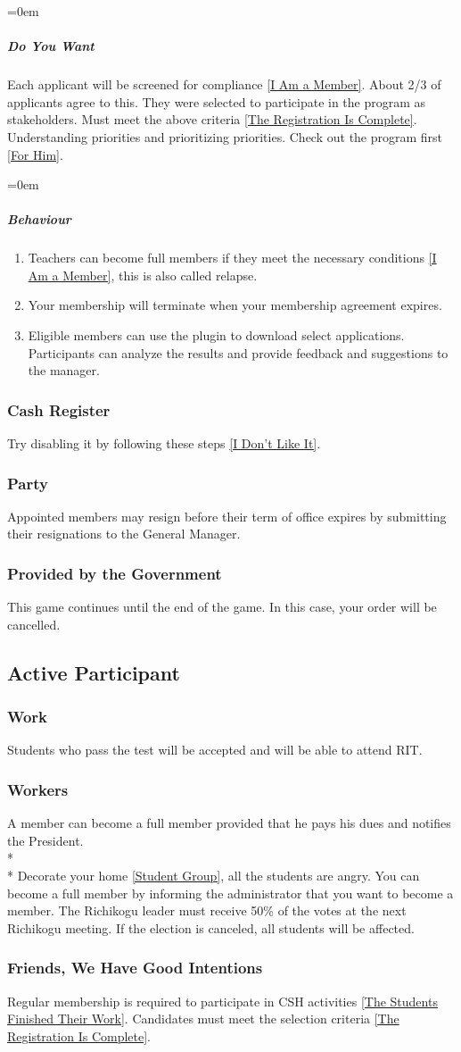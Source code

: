 \documentclass{article}
\newcommand{\asection}[1]{\subsection{#1} \label{#1}}
\newcommand{\asubsection}[1]{\subsubsection{#1} \label{#1}}
\newcommand{\asubsubsubsection}[1]{\parindent=0em\subparagraph{#1} \label{#1}}
\begin{document}
\asubsubsubsection{Do You Want}
Each applicant will be screened for compliance \ref{I Am a Member}.
About 2/3 of applicants agree to this.
They were selected to participate in the program as stakeholders. Must meet the above criteria \ref{The Registration Is Complete}.
Understanding priorities and prioritizing priorities.
Check out the program first \ref{For Him}.

\asubsubsubsection{Behaviour}
\renewcommand{\theenumi}{\alph{enumi}} %
\begin{enumerate}
	\item Teachers can become full members if they meet the necessary conditions \ref{I Am a Member}, this is also called relapse.
	\item Your membership will terminate when your membership agreement expires.
	\item Eligible members can use the plugin to download select applications.
	      Participants can analyze the results and provide feedback and suggestions to the manager.
\end{enumerate}

\asubsection{Cash Register}
Try disabling it by following these steps \ref{I Don’t Like It}.

\asubsection{Party}
Appointed members may resign before their term of office expires by submitting their resignations to the General Manager.

\asubsection{Provided by the Government}
This game continues until the end of the game. In this case, your order will be cancelled.

\asection{Active Participant}

\asubsection{Work}
Students who pass the test will be accepted and will be able to attend RIT.

\asubsection{Workers}
A member can become a full member provided that he pays his dues and notifies the President.
\\*\\*
Decorate your home \ref{Student Group}, all the students are angry.
You can become a full member by informing the administrator that you want to become a member.
The Richikogu leader must receive 50\% of the votes at the next Richikogu meeting.
If the election is canceled, all students will be affected.

\asubsection{Friends, We Have Good Intentions}
Regular membership is required to participate in CSH activities \ref{The Students Finished Their Work}.
Candidates must meet the selection criteria \ref{The Registration Is Complete}.
\end{document}
